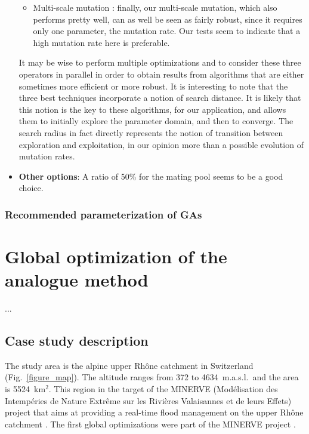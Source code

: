 \documentclass[twocol]{ametsoc}
\begin{document}
\begin{itemize}
\begin{itemize}
		\item Multi-scale mutation \citep{Horton2012a}: finally, our multi-scale mutation, which also performs pretty well, can as well be seen as fairly robust, since it requires only one parameter, the mutation rate. Our tests seem to indicate that a high mutation rate here is preferable.
	\end{itemize}
	
	It may be wise to perform multiple optimizations and to consider these three operators in parallel in order to obtain results from algorithms that are either sometimes more efficient or more robust. It is interesting to note that the three best techniques incorporate a notion of search distance. It is likely that this notion is the key to these algorithms, for our application, and allows them to initially explore the parameter domain, and then to converge. The search radius in fact directly represents the notion of transition between exploration and exploitation, in our opinion more than a possible evolution of mutation rates.
	
	
	
	
	   
	
	

	
	
	\item \textbf{Other options}: A ratio of 50\% for the mating pool seems to be a good choice.
	
\end{itemize}











\subsubsection{Recommended parameterization of GAs}

	



\section{Global optimization of the analogue method}
...

\subsection{Case study description}

The study area is the alpine upper Rhône catchment in Switzerland (Fig.\ \ref{figure_map}). The altitude ranges from 372 to 4634~m.a.s.l.\ and the area is 5524~km$^{2}$. This region in the target of the MINERVE (Mod\'{e}lisation des Intemp\'{e}ries de Nature Extr\^{e}me sur les Rivi\`{e}res Valaisannes et de leurs Effets) project that aims at providing a real-time flood management on the upper Rh\^{o}ne catchment \citep{GarciaHernandez2009b}. The first global optimizations were part of the MINERVE project \citep{Horton2012, Horton2012a}.
\end{document}
